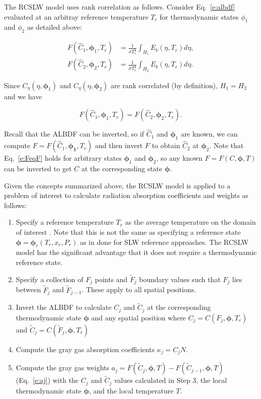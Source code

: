 \documentclass[preprint,12pt]{elsarticle}
\newcommand{\BS}{\boldsymbol}
\begin{document}
The RCSLW model uses rank correlation as follows.
Consider Eq.~\ref{e:albdf} evaluated at an arbitray reference temperature $T_r$ for thermodynamic states $\phi_1$ and $\phi_2$ as detailed above:
%
\begin{linenomath}
    \begin{align} \label{e:albdf2}
        F(\hat{C}_1,\BS{\phi}_1,T_r) &= \frac{1}{\sigma T_r^4}\int_{H_1}E_b(\eta,T_r)d\eta, \\
        F(\hat{C}_2,\BS{\phi}_2,T_r) &= \frac{1}{\sigma T_r^4}\int_{H_2}E_b(\eta,T_r)d\eta.
    \end{align}
\end{linenomath}
%
Since $C_\eta(\eta,\BS{\phi}_1)$ and $C_\eta(\eta,\BS{\phi}_2)$ are rank correlated (by definition), $H_1=H_2$ and we have 
%
\begin{linenomath}
    \begin{equation}\label{e:FeqF}
    F(\hat{C}_1,\BS{\phi}_1,T_r)=F(\hat{C}_2,\BS{\phi}_2,T_r).
\end{equation}
\end{linenomath}
%
Recall that the ALBDF can be inverted, so if $\hat{C}_1$ and $\BS{\phi}_1$ are known, we can compute $F=F(\hat{C}_1,\BS{\phi_1},T_r)$ and then invert $F$ to obtain $\hat{C}_2$ at $\BS{\phi}_2$. Note that Eq.~\ref{e:FeqF} holds for arbitrary states $\BS{\phi}_1$ and $\BS{\phi}_2$, so any known $F=F(C,\BS{\phi},T)$ can be inverted to get $C$ at the corresponding state $\BS{\phi}$. 

Given the concepts summarized above, the RCSLW model is applied to a problem of interest to calculate radiation absorption coefficients and weights as follows:
%
\begin{enumerate}
    \item Specify a reference temperature $T_r$ as the average temperature on the domain of interest \cite{Solovjov_2001}. Note that this is not the same as specifying a reference state $\BS{\phi}=\BS{\phi}_r(T_r,x_r,P_r)$ as in done for SLW reference approaches. The RCSLW model has the significant advantage that it does not require a thermodynamic reference state.
    \item Specify a collection of $F_j$ points and $\tilde{F}_j$ boundary values such that $F_j$ lies between $\tilde{F}_j$ and $\tilde{F}_{j-1}$. These apply to all spatial positions. 
    \item Invert the ALBDF to calculate $C_j$ and $\tilde{C}_j$ at the corresponding thermodynamic state $\BS{\phi}$ and any spatial position where $C_j = C(F_j,\BS{\phi},T_r)$ and $\tilde{C}_j = C(\tilde{F}_j,\BS{\phi},T_r)$
    \item Compute the gray gas absorption coefficients $\kappa_j=C_jN$. 
    \item Compute the gray gas weights $a_j=F(\tilde{C}_j,\BS{\phi}, T) - F(\tilde{C}_{j-1},\BS{\phi}, T)$ (Eq.~\ref{e:aj}) with the $C_j$ and $\tilde{C}_j$ values calculated in Step 3, the local thermodynamic state $\BS{\phi}$, and the local temperature $T$.
\end{enumerate}
\end{document}
